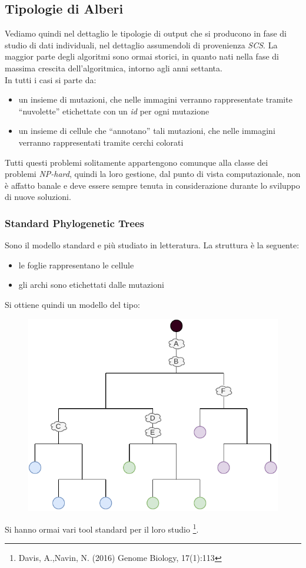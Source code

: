 \documentclass[a4paper,12pt, oneside]{book}
\begin{document}
\subsection{Tipologie di Alberi}
Vediamo quindi nel dettaglio le tipologie di output che si producono in fase di
studio di dati individuali, nel dettaglio assumendoli di provenienza
\textit{SCS}. La maggior parte degli algoritmi sono ormai storici, 
in quanto nati nella fase di massima crescita dell'algoritmica, intorno agli
anni settanta.\\
In tutti i casi si parte da:
\begin{itemize}
  \item un insieme di mutazioni, che nelle immagini verranno rappresentate
  tramite ``nuvolette'' etichettate con un \textit{id} per ogni mutazione
  \item un insieme di cellule che ``annotano'' tali mutazioni, che nelle
  immagini verranno rappresentati tramite cerchi colorati
\end{itemize}
Tutti questi problemi solitamente appartengono comunque alla classe dei problemi
\textit{NP-hard}, quindi la loro gestione, dal punto di vista computazionale,
non è affatto banale e deve essere sempre tenuta in considerazione durante lo
sviluppo di nuove soluzioni.
\subsubsection{Standard Phylogenetic Trees}
Sono il modello standard e più studiato in letteratura. La struttura è la
seguente:
\begin{itemize}
  \item le foglie rappresentano le cellule
  \item gli archi sono etichettati dalle mutazioni
\end{itemize}
Si ottiene quindi un modello del tipo:
\begin{figure}[H]
  \centering
  \includegraphics[scale = 0.9]{img/sf.pdf}
\end{figure}
Si hanno ormai vari tool standard per il loro studio \footnote{Davis, A.,Navin,
  N. (2016) Genome Biology, 17(1):113}. 
\end{document}
